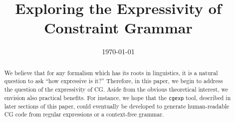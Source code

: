 \documentclass[11pt]{article}
\title{Exploring the Expressivity of Constraint Grammar}
\date{\today}
\begin{document}
\maketitle

\begin{abstract}
  We believe that for any formalism which has its roots in linguistics, it is a
  natural question to ask ``how expressive is it?''
  Therefore, in this paper, we begin to address the question of the expressivity
  of CG. 
  Aside from the obvious theoretical interest, we envision also practical benefits.
  For instance, we hope that the \texttt{cgexp} tool, described in later sections
  of this paper, could eventually be developed to generate human-readable CG code
  from regular expressions or a context-free grammar. 

\end{abstract}

\end{document}
